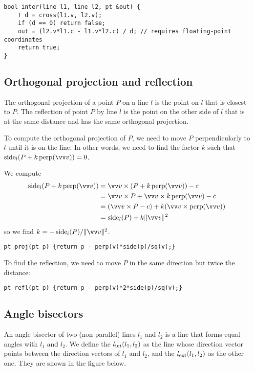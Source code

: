 \begin{lstlisting}
bool inter(line l1, line l2, pt &out) {
    T d = cross(l1.v, l2.v);
    if (d == 0) return false;
    out = (l2.v*l1.c - l1.v*l2.c) / d; // requires floating-point coordinates
    return true;
}
\end{lstlisting}

\subsection{Orthogonal projection and reflection}\label{ss:proj-refl}
The orthogonal projection of a point $P$ on a line $l$ is the point on $l$ that is closest to $P$. The reflection of point $P$ by line $l$ is the point on the other side of $l$ that is at the same distance and has the same orthogonal projection.


To compute the orthogonal projection of $P$, we need to move $P$ perpendicularly to $l$ until it is on the line.
In other words, we need to find the factor $k$ such that $\side_l(P+k\perpop(\dir)) = 0$.

We compute
\begin{align*}
\side_l(P + k\perpop(\dir))
&= \dir \times (P + k\perpop(\dir)) - c\\
&= \dir \times P + \dir \times k\perpop(\dir) - c\\
&= (\dir \times P - c) + k (\dir \times \perpop(\dir))\\
&= \side_l(P) + k \norm{\dir}^2
\end{align*}
so we find $k = -\side_l(P) / \norm{\dir}^2$.
\begin{lstlisting}
pt proj(pt p) {return p - perp(v)*side(p)/sq(v);}
\end{lstlisting}

To find the reflection, we need to move $P$ in the same direction but twice the distance:
\begin{lstlisting}
pt refl(pt p) {return p - perp(v)*2*side(p)/sq(v);}
\end{lstlisting}

\subsection{Angle bisectors}
An angle bisector of two (non-parallel) lines $l_1$ and $l_2$ is a line that forms equal angles with $l_1$ and $l_2$. We define the  ${l_\mathrm{int}(l_1,l_2)}$ as the line whose direction vector points between the direction vectors of $l_1$ and $l_2$, and the  ${l_\mathrm{ext}(l_1,l_2)}$ as the other one. They are shown in the figure below.


